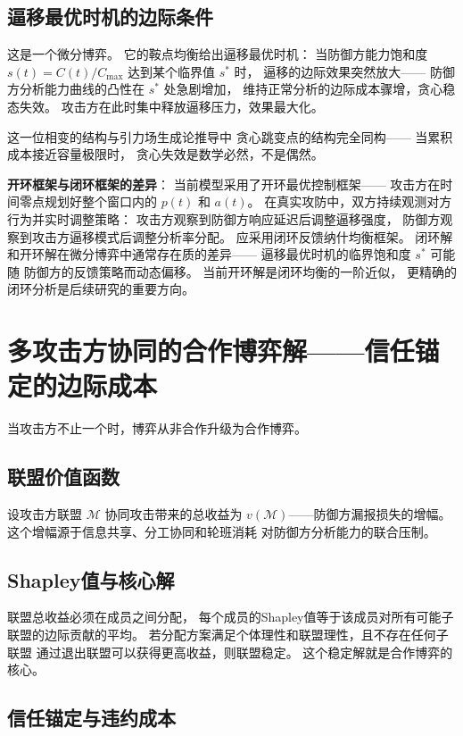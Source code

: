 \documentclass[11pt,a4paper]{article}
\begin{document}
\subsection{逼移最优时机的边际条件}

这是一个微分博弈。
它的鞍点均衡给出逼移最优时机：
当防御方能力饱和度 \(s(t) = C(t)/C_{\max}\)
达到某个临界值 \(s^*\) 时，
逼移的边际效果突然放大——
防御方分析能力曲线的凸性在 \(s^*\) 处急剧增加，
维持正常分析的边际成本骤增，贪心稳态失效。
攻击方在此时集中释放逼移压力，效果最大化。

这一位相变的结构与引力场生成论推导中
贪心跳变点的结构完全同构——
当累积成本接近容量极限时，
贪心失效是数学必然，不是偶然。

\textbf{开环框架与闭环框架的差异}：
当前模型采用了开环最优控制框架——
攻击方在时间零点规划好整个窗口内的 \(p(t)\) 和 \(a(t)\)。
在真实攻防中，双方持续观测对方行为并实时调整策略：
攻击方观察到防御方响应延迟后调整逼移强度，
防御方观察到攻击方逼移模式后调整分析率分配。
应采用闭环反馈纳什均衡框架。
闭环解和开环解在微分博弈中通常存在质的差异——
逼移最优时机的临界饱和度 \(s^*\) 可能随
防御方的反馈策略而动态偏移。
当前开环解是闭环均衡的一阶近似，
更精确的闭环分析是后续研究的重要方向。

\section{多攻击方协同的合作博弈解——信任锚定的边际成本}

当攻击方不止一个时，博弈从非合作升级为合作博弈。

\subsection{联盟价值函数}

设攻击方联盟 \(\mathcal{M}\) 协同攻击带来的总收益为
\(v(\mathcal{M})\)——防御方漏报损失的增幅。
这个增幅源于信息共享、分工协同和轮班消耗
对防御方分析能力的联合压制。

\subsection{Shapley值与核心解}

联盟总收益必须在成员之间分配，
每个成员的Shapley值等于该成员对所有可能子联盟的边际贡献的平均。
若分配方案满足个体理性和联盟理性，且不存在任何子联盟
通过退出联盟可以获得更高收益，则联盟稳定。
这个稳定解就是合作博弈的核心。

\subsection{信任锚定与违约成本}
\end{document}
